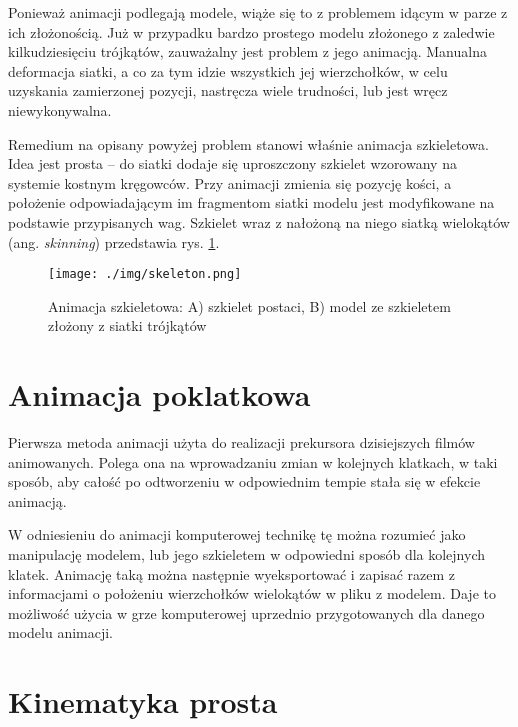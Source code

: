 \documentclass[11pt]{mwrep}
\begin{document}
Ponieważ animacji podlegają modele, wiąże się to z problemem idącym w parze z ich złożonością. Już w przypadku bardzo prostego modelu złożonego z zaledwie kilkudziesięciu trójkątów, zauważalny jest problem z jego animacją. Manualna deformacja siatki, a co za tym idzie wszystkich jej wierzchołków, w celu uzyskania zamierzonej pozycji, nastręcza wiele trudności, lub jest wręcz niewykonywalna.

Remedium na opisany powyżej problem stanowi właśnie animacja szkieletowa. Idea jest prosta -- do siatki dodaje się uproszczony szkielet wzorowany na systemie kostnym kręgowców. Przy animacji zmienia się pozycję kości, a położenie odpowiadającym im fragmentom siatki modelu jest modyfikowane na podstawie przypisanych wag. Szkielet wraz z nałożoną na niego siatką wielokątów (ang. \textit{skinning}) przedstawia rys. \ref{img:skeleton}.

    \begin{figure}
  \centering
    \texttt{[image: ./img/skeleton.png]}
  \caption{Animacja szkieletowa: A) szkielet postaci, B) model ze szkieletem złożony z siatki trójkątów}
  \label{img:skeleton}
  \end{figure}

  \section{Animacja poklatkowa}
  
Pierwsza metoda animacji użyta do realizacji prekursora dzisiejszych filmów animowanych. Polega ona na wprowadzaniu zmian w kolejnych klatkach, w taki sposób, aby całość po odtworzeniu w odpowiednim tempie stała się w efekcie animacją.

W odniesieniu do animacji komputerowej technikę tę można rozumieć jako manipulację modelem, lub jego szkieletem w odpowiedni sposób dla kolejnych klatek. Animację taką można następnie wyeksportować i zapisać razem z informacjami o położeniu wierzchołków wielokątów w pliku z modelem. Daje to możliwość użycia w grze komputerowej uprzednio przygotowanych dla danego modelu animacji.

  \section{Kinematyka prosta}
\end{document}
